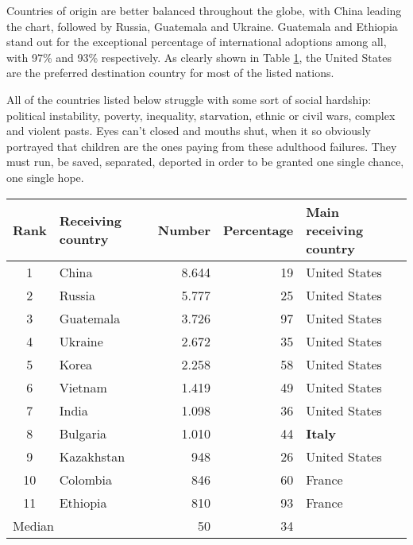 Countries of origin are better balanced throughout the globe, with China leading the chart, followed by Russia, Guatemala and Ukraine. Guatemala and Ethiopia stand out for the exceptional percentage of international adoptions among all, with 97\% and 93\% respectively. As clearly shown in Table \ref{tab:intadoptcountriesorigin}, the United States are the preferred destination country for most of the listed nations. 

All of the countries listed below struggle with some sort of social hardship: political instability, poverty, inequality, starvation, ethnic or civil wars, complex and violent pasts. Eyes can't closed and mouths shut, when it so obviously portrayed that children are the ones paying from these adulthood failures. They must run, be saved, separated, deported in order to be granted one single chance, one single hope.

\begin{table}[H]
   \centering
   \begin{tabular}{c l r r l}
      Rank & Receiving country\footnotemark[1] & Number & Percentage & Main receiving country\\
      \hline
      1 & China & 8.644 & 19 & United States\\
      2 & Russia & 5.777 & 25 & United States\\
      3 & Guatemala & 3.726 & 97 & United States\\
      4 & Ukraine & 2.672 & 35 & United States\\
      5 & Korea & 2.258 & 58 & United States\\
      6 & Vietnam & 1.419 & 49 & United States\\
      7 & India & 1.098 & 36 & United States\\
      8 & Bulgaria & 1.010 & 44 &  \textcolor{BrickRed}{\textbf{Italy}}\\
      9 & Kazakhstan & 948 & 26 & United States\\
      10 & Colombia & 846 & 60 & France\\
      11 & Ethiopia & 810 & 93 & France\\
      \hline
      \multicolumn{2}{l}{Median} & 50 & 34 &\\
   \end{tabular}
    \label{tab:intadoptcountriesorigin}
\end{table}

